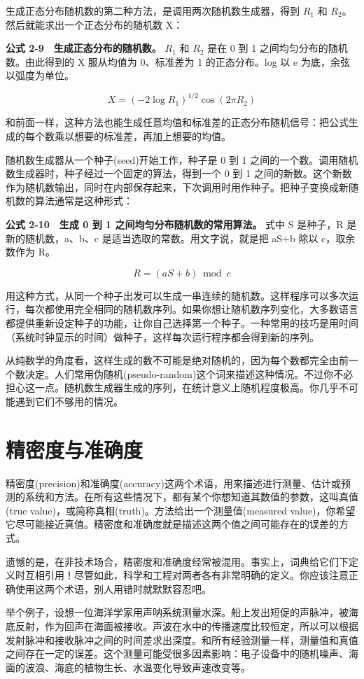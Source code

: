 生成正态分布随机数的第二种方法，是调用两次随机数生成器，得到 \(R_1\) 和
\(R_2\)。然后就能求出一个正态分布的随机数 X：

\textbf{公式 2-9　生成正态分布的随机数。} \(R_1\) 和 \(R_2\) 是在 0 到 1
之间均匀分布的随机数。由此得到的 X 服从均值为 0、标准差为 1
的正态分布。log 以 e 为底，余弦以弧度为单位。

\[
X = (-2\log R_1)^{1/2}\cos(2\pi R_2)
\]

和前面一样，这种方法也能生成任意均值和标准差的正态分布随机信号：把公式生成的每个数乘以想要的标准差，再加上想要的均值。

随机数生成器从一个种子(seed)开始工作，种子是 0 到 1
之间的一个数。调用随机数生成器时，种子经过一个固定的算法，得到一个 0 到
1
之间的新数。这个新数作为随机数输出，同时在内部保存起来，下次调用时用作种子。把种子变换成新随机数的算法通常是这种形式：

\textbf{公式 2-10　生成 0 到 1 之间均匀分布随机数的常用算法。} 式中 S
是种子，R 是新的随机数，a、b、c 是适当选取的常数。用文字说，就是把 aS+b
除以 c，取余数作为 R。

\[
R = (aS + b) \bmod c
\]

用这种方式，从同一个种子出发可以生成一串连续的随机数。这样程序可以多次运行，每次都使用完全相同的随机数序列。如果你想让随机数序列变化，大多数语言都提供重新设定种子的功能，让你自己选择第一个种子。一种常用的技巧是用时间（系统时钟显示的时间）做种子，这样每次运行程序都会得到新的序列。

从纯数学的角度看，这样生成的数不可能是绝对随机的，因为每个数都完全由前一个数决定。人们常用伪随机(pseudo-random)这个词来描述这种情况。不过你不必担心这一点。随机数生成器生成的序列，在统计意义上随机程度极高。你几乎不可能遇到它们不够用的情况。

\section{精密度与准确度}

精密度(precision)和准确度(accuracy)这两个术语，用来描述进行测量、估计或预测的系统和方法。在所有这些情况下，都有某个你想知道其数值的参数，这叫真值(true
value)，或简称真相(truth)。方法给出一个测量值(measured
value)，你希望它尽可能接近真值。精密度和准确度就是描述这两个值之间可能存在的误差的方式。

遗憾的是，在非技术场合，精密度和准确度经常被混用。事实上，词典给它们下定义时互相引用！尽管如此，科学和工程对两者各有非常明确的定义。你应该注意正确使用这两个术语，别人用错时就默默容忍吧。

举个例子，设想一位海洋学家用声呐系统测量水深。船上发出短促的声脉冲，被海底反射，作为回声在海面被接收。声波在水中的传播速度比较恒定，所以可以根据发射脉冲和接收脉冲之间的时间差求出深度。和所有经验测量一样，测量值和真值之间存在一定的误差。这个测量可能受很多因素影响：电子设备中的随机噪声、海面的波浪、海底的植物生长、水温变化导致声速改变等。

